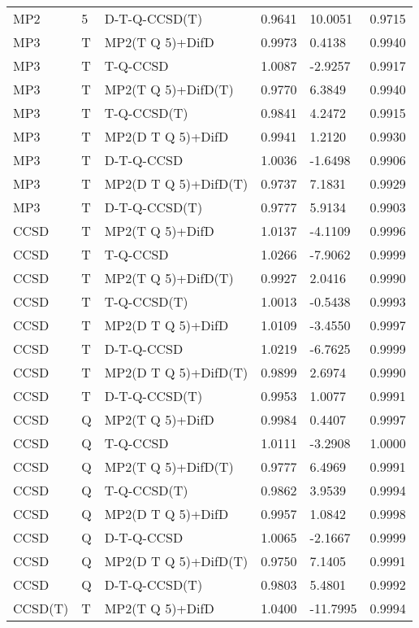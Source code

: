 \begin{table}
\begin{tabular}{l l l l l l }
    MP2 & 5 & D-T-Q-CCSD(T) & 0.9641 & 10.0051 & 0.9715 \\ 
    MP3 & T & MP2(T Q 5)+DifD & 0.9973 & 0.4138 & 0.9940 \\ 
    MP3 & T & T-Q-CCSD & 1.0087 & -2.9257 & 0.9917 \\ 
    MP3 & T & MP2(T Q 5)+DifD(T) & 0.9770 & 6.3849 & 0.9940 \\ 
    MP3 & T & T-Q-CCSD(T) & 0.9841 & 4.2472 & 0.9915 \\ 
    MP3 & T & MP2(D T Q 5)+DifD & 0.9941 & 1.2120 & 0.9930 \\ 
    MP3 & T & D-T-Q-CCSD & 1.0036 & -1.6498 & 0.9906 \\ 
    MP3 & T & MP2(D T Q 5)+DifD(T) & 0.9737 & 7.1831 & 0.9929 \\ 
    MP3 & T & D-T-Q-CCSD(T) & 0.9777 & 5.9134 & 0.9903 \\ 
    CCSD & T & MP2(T Q 5)+DifD & 1.0137 & -4.1109 & 0.9996 \\ 
    CCSD & T & T-Q-CCSD & 1.0266 & -7.9062 & 0.9999 \\ 
    CCSD & T & MP2(T Q 5)+DifD(T) & 0.9927 & 2.0416 & 0.9990 \\ 
    CCSD & T & T-Q-CCSD(T) & 1.0013 & -0.5438 & 0.9993 \\ 
    CCSD & T & MP2(D T Q 5)+DifD & 1.0109 & -3.4550 & 0.9997 \\ 
    CCSD & T & D-T-Q-CCSD & 1.0219 & -6.7625 & 0.9999 \\ 
    CCSD & T & MP2(D T Q 5)+DifD(T) & 0.9899 & 2.6974 & 0.9990 \\ 
    CCSD & T & D-T-Q-CCSD(T) & 0.9953 & 1.0077 & 0.9991 \\ 
    CCSD & Q & MP2(T Q 5)+DifD & 0.9984 & 0.4407 & 0.9997 \\ 
    CCSD & Q & T-Q-CCSD & 1.0111 & -3.2908 & 1.0000 \\ 
    CCSD & Q & MP2(T Q 5)+DifD(T) & 0.9777 & 6.4969 & 0.9991 \\ 
    CCSD & Q & T-Q-CCSD(T) & 0.9862 & 3.9539 & 0.9994 \\ 
    CCSD & Q & MP2(D T Q 5)+DifD & 0.9957 & 1.0842 & 0.9998 \\ 
    CCSD & Q & D-T-Q-CCSD & 1.0065 & -2.1667 & 0.9999 \\ 
    CCSD & Q & MP2(D T Q 5)+DifD(T) & 0.9750 & 7.1405 & 0.9991 \\ 
    CCSD & Q & D-T-Q-CCSD(T) & 0.9803 & 5.4801 & 0.9992 \\ 
    CCSD(T) & T & MP2(T Q 5)+DifD & 1.0400 & -11.7995 & 0.9994 \\ 

\end{tabular}
\end{table}
